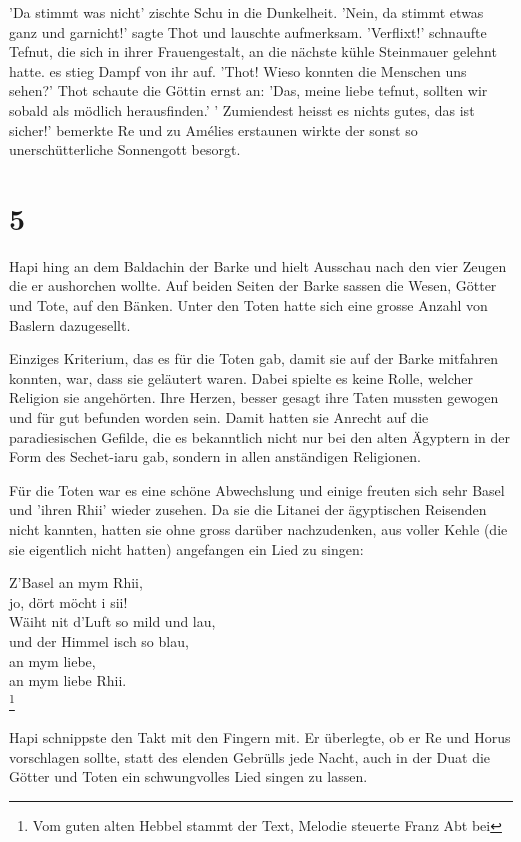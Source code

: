 \documentclass[11pt,titlepage,a5paper]{book}
\begin{document}
'Da stimmt was nicht' zischte Schu in die Dunkelheit. 'Nein, da stimmt etwas ganz und garnicht!' sagte Thot und lauschte aufmerksam. 'Verflixt!' schnaufte Tefnut, die sich in ihrer Frauengestalt, an die nächste kühle Steinmauer gelehnt hatte. es stieg Dampf von ihr auf. 'Thot! Wieso konnten die Menschen uns sehen?' Thot schaute die Göttin ernst an: 'Das, meine liebe tefnut, sollten wir sobald als mödlich herausfinden.' ' Zumiendest heisst es nichts gutes, das ist sicher!' bemerkte Re und zu Amélies erstaunen wirkte der sonst so unerschütterliche Sonnengott besorgt.

\section*{5}

Hapi hing an dem Baldachin der Barke und hielt Ausschau nach den vier Zeugen die er aushorchen wollte. Auf beiden Seiten der Barke sassen die Wesen, Götter und Tote, auf den Bänken. Unter den Toten hatte sich eine grosse Anzahl von Baslern dazugesellt. 

Einziges Kriterium, das es für die Toten gab, damit sie auf der Barke mitfahren konnten, war, dass sie geläutert waren. Dabei spielte es keine Rolle, welcher Religion sie angehörten. Ihre Herzen, besser gesagt ihre Taten mussten gewogen und für gut befunden worden sein. Damit hatten sie Anrecht auf die paradiesischen Gefilde, die es bekanntlich nicht nur bei den alten Ägyptern in der Form des Sechet-iaru gab, sondern in allen anständigen Religionen.

Für die Toten war es eine schöne Abwechslung und einige freuten sich sehr Basel und 'ihren Rhii' wieder zusehen. Da sie die Litanei der ägyptischen Reisenden nicht kannten, hatten sie ohne gross darüber nachzudenken, aus voller Kehle (die sie eigentlich nicht hatten) angefangen ein Lied zu singen:

Z'Basel an mym Rhii,\\
jo, dört möcht i sii!\\
Wäiht nit d'Luft so mild und lau,\\
und der Himmel isch so blau,\\
an mym liebe,\\
an mym liebe Rhii.\\\footnote{Vom guten alten Hebbel stammt der Text, Melodie steuerte Franz Abt bei}

Hapi schnippste den Takt mit den Fingern mit. Er überlegte, ob er Re und Horus vorschlagen sollte, statt des elenden Gebrülls jede Nacht, auch in der Duat die Götter und Toten ein schwungvolles Lied singen zu lassen. 
\end{document}
